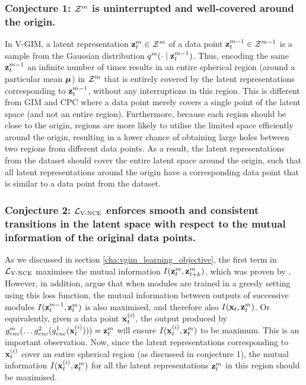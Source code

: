 		\subsubsection{Conjecture 1: $\mathcal{Z}^m$ is uninterrupted and well-covered around the origin.}
			In V-GIM, a latent representation $\mathbf{z}_t^m \in \mathcal{Z}^m$ of a data point $\mathbf{z}_t^{m-1} \in \mathcal{Z}^{m-1}$ is a sample from the Gaussian distribution $q^m(\cdot \mid \mathbf{z}_t^{m-1})$. Thus, encoding the same $\mathbf{z}_t^{m-1}$ an infinite number of times results in an entire spherical region (around a particular mean $\bm{\mu}$) in $\mathcal{Z}^m$ that is entirely covered by the latent representations corresponding to $\mathbf{z}_t^{m-1}$, without any interruptions in this region. This is different from GIM and CPC where a data point merely covers a single point of the latent space (and not an entire region). Furthermore, because each region should be close to the origin, regions are more likely to utilise the limited space efficiently around the origin, resulting in a lower chance of obtaining large holes between two regions from different data points. As a result, the latent representations from the dataset should cover the entire latent space around the origin, such that all latent representations around the origin have a corresponding data point that is similar to a data point from the dataset.
		
	
		\subsubsection{Conjecture 2: $\mathcal{L}_{\text{V-NCE}}$ enforces smooth and consistent transitions in the latent space with respect to the mutual information of the original data points.}
			As we discussed in section \ref{cha:vgim_learning_objective}, the first term in $\mathcal{L}_{\text{V-NCE}}$ maximises the mutual information $I(\mathbf{z}_t^{m}, \mathbf{z}_{t+k}^m)$, which was proven by \cite{oordRepresentationLearningContrastive2019}. However, in addition, \cite{lowePuttingEndEndtoEnd2020a} argue that when modules are trained in a greedy setting using this loss function, the mutual information between outputs of successive modules $I(\mathbf{z}_t^{m-1}, \mathbf{z}_t^{m})$ is also maximised, and therefore also $I(\mathbf{x}_t, \mathbf{z}_t^{m})$. Or equivalently, given a data point $\mathbf{x}_t^{(i)}$, the output produced by $ g_{enc}^m ( \dots	g_{enc}^2(g_{enc}^1(\mathbf{x}_t^{(i)}))) = \mathbf{z}_t^m$ will ensure $I(\mathbf{x}_t^{(i)}, \mathbf{z}_t^{m})$ to be maximum. This is an important observation. Now, since the latent representations corresponding to $\mathbf{x}_t^{(i)}$ cover an entire spherical region (as discussed in conjecture 1), the mutual information $I(\mathbf{x}_t^{(i)}, \mathbf{z}_t^{m})$ for all the latent representations $\mathbf{z}_t^{m}$ in this region should be maximised.
			
